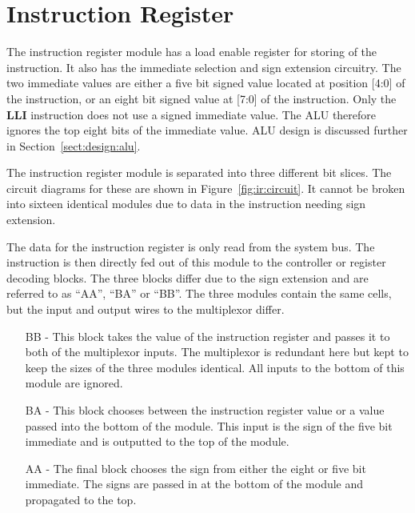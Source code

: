 
\section{Instruction Register}


The instruction register module has a load enable register for storing of the instruction.
It also has the immediate selection and sign extension circuitry.
The two immediate values are either a five bit signed value located at position [4:0] of the instruction, or an eight bit signed value at [7:0] of the instruction.
Only the \textbf{LLI} instruction does not use a signed immediate value. 
The ALU therefore ignores the top eight bits of the immediate value. 
ALU design is discussed further in Section~\ref{sect:design:alu}.


The instruction register module is separated into three different bit slices.
The circuit diagrams for these are shown in Figure~\ref{fig:ir:circuit}.
It cannot be broken into sixteen identical modules due to data in the instruction needing sign extension. 

The data for the instruction register is only read from the system bus. 
The instruction is then directly fed out of this module to the controller or register decoding blocks.
The three blocks differ due to the sign extension and are referred to as ``AA'', ``BA'' or ``BB''.
The three modules contain the same cells, but the input and output wires to the multiplexor differ. 
\begin{enumerate}
\item[BB] - This block takes the value of the instruction register and passes it to both of the multiplexor inputs. The multiplexor is redundant here but kept to keep the sizes of the three modules identical. All inputs to the bottom of this module are ignored.
\item[BA] - This block chooses between the instruction register value or a value passed into the bottom of the module. This input is the sign of the five bit immediate and is outputted to the top of the module.
\item[AA] - The final block chooses the sign from either the eight or five bit immediate. The signs are passed in at the bottom of the module and propagated to the top. 
\end{enumerate}

